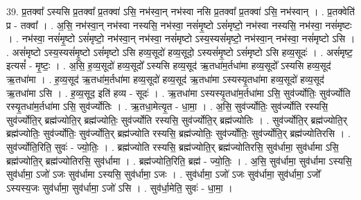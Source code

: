 \documentclass[17pt]{extarticle}
\begin{document}
39. प्र॒तक्वा᳚ ऽस्यसि प्र॒तक्वा᳚ प्र॒तक्वा॑ ऽसि॒ नभ॑स्वा॒न् नभ॑स्वा नसि प्र॒तक्वा᳚ प्र॒तक्वा॑ ऽसि॒ नभ॑स्वान् । . प्र॒तक्वेति॑ प्र - तक्वा᳚ । . अ॒सि॒ नभ॑स्वा॒न् नभ॑स्वा नस्यसि॒ नभ॑स्वा॒ नसं॑मृ॒ष्टो ऽसं॑मृष्टो॒ नभ॑स्वा नस्यसि॒ 
नभ॑स्वा॒ नसं॑मृष्टः । . नभ॑स्वा॒ नसं॑मृ॒ष्टो ऽसं॑मृष्टो॒ नभ॑स्वा॒न् नभ॑स्वा॒ नसं॑मृष्टो ऽस्य॒स्यसं॑मृष्टो॒ नभ॑स्वा॒न् नभ॑स्वा॒ नसं॑मृष्टो ऽसि । . असं॑मृष्टो ऽस्य॒स्यसं॑मृ॒ष्टो ऽसं॑मृष्टो ऽसि हव्य॒सूदो॑ हव्य॒सूदो॒ ऽस्यसं॑मृ॒ष्टो ऽसं॑मृष्टो ऽसि हव्य॒सूदः॑ । . असं॑मृष्ट॒ इत्यसं᳚ - मृ॒ष्टः॒ । . अ॒सि॒ ह॒व्य॒सूदो॑ हव्य॒सूदो᳚ ऽस्यसि हव्य॒सूद॑ ऋ॒तधा॑म॒र्तधा॑मा हव्य॒सूदो᳚ ऽस्यसि हव्य॒सूद॑ ऋ॒तधा॑मा । . ह॒व्य॒सूद॑ ऋ॒तधा॑म॒र्तधा॑मा हव्य॒सूदो॑ हव्य॒सूद॑ ऋ॒तधा॑मा ऽस्यस्यृ॒तधा॑मा हव्य॒सूदो॑ हव्य॒सूद॑ ऋ॒तधा॑मा ऽसि । . ह॒व्य॒सूद॒ इति॑ हव्य - सूदः॑ । . ऋ॒तधा॑मा ऽस्यस्यृ॒तधा॑म॒र्तधा॑मा ऽसि॒ सुव॑र्ज्योतिः॒ सुव॑र्ज्योति रस्यृ॒तधा॑म॒र्तधा॑मा ऽसि॒ सुव॑र्ज्योतिः । . ऋ॒तधा॒मेत्यृ॒त - धा॒मा॒ । . अ॒सि॒ सुव॑र्ज्योतिः॒ सुव॑र्ज्योति रस्यसि॒ सुव॑र्ज्योति॒र् ब्रह्म॑ज्योति॒र् ब्रह्म॑ज्योतिः॒ सुव॑र्ज्योति रस्यसि॒ सुव॑र्ज्योति॒र् ब्रह्म॑ज्योतिः । . सुव॑र्ज्योति॒र् ब्रह्म॑ज्योति॒र् ब्रह्म॑ज्योतिः॒ सुव॑र्ज्योतिः॒ सुव॑र्ज्योति॒र् ब्रह्म॑ज्योति रस्यसि॒ ब्रह्म॑ज्योतिः॒ सुव॑र्ज्योतिः॒ सुव॑र्ज्योति॒र् ब्रह्म॑ज्योतिरसि । . सुव॑र्ज्योति॒रिति॒ सुवः॑ - ज्यो॒तिः॒ । . ब्रह्म॑ज्योति रस्यसि॒ ब्रह्म॑ज्योति॒र् ब्रह्म॑ज्योतिरसि॒ सुव॑र्धामा॒ सुव॑र्धामा ऽसि॒ ब्रह्म॑ज्योति॒र् ब्रह्म॑ज्योतिरसि॒ सुव॑र्धामा । . ब्रह्म॑ज्योति॒रिति॒ ब्रह्म॑ - ज्यो॒तिः॒ । . अ॒सि॒ सुव॑र्धामा॒ सुव॑र्धामा ऽस्यसि॒ सुव॑र्धामा॒ ऽजो॑ ऽजः सुव॑र्धामा ऽस्यसि॒ सुव॑र्धामा॒ ऽजः । . सुव॑र्धामा॒ ऽजो॑ ऽजः सुव॑र्धामा॒ सुव॑र्धामा॒ ऽजो᳚ ऽस्यस्य॒जः सुव॑र्धामा॒ सुव॑र्धामा॒ ऽजो॑ ऽसि । . सुव॑र्धा॒मेति॒ सुवः॑ - धा॒मा॒ । \newline
\end{document}
